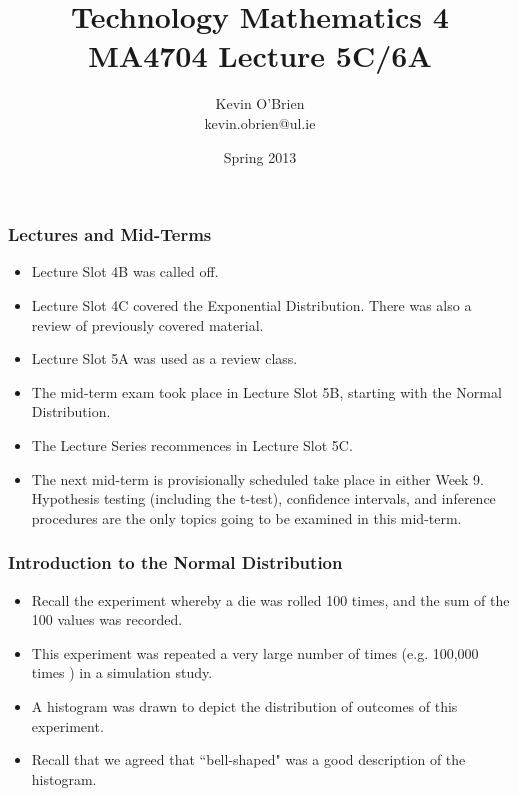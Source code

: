 \documentclass[a4]{beamer}
\title[MA4704]{Technology Mathematics 4 \\ {\normalsize MA4704 Lecture 5C/6A}}
\author[Kevin O'Brien]{Kevin O'Brien \\ {\scriptsize kevin.obrien@ul.ie}}
\date{Spring 2013}
\institute[Maths \& Stats]{Dept. of Mathematics \& Statistics, \\ University \textit{of} Limerick}
\begin{document}
\begin{frame}
\titlepage
\end{frame}
\begin{frame}
\frametitle{Lectures and Mid-Terms}
\begin{itemize}
\item Lecture Slot 4B was called off.
\item Lecture Slot 4C covered the Exponential Distribution. There was also a review of previously covered material.
\item Lecture Slot 5A was used as a review class.
\item The mid-term exam took place in Lecture Slot 5B, starting with the Normal Distribution.
\item The Lecture Series recommences in Lecture Slot 5C.
\item The next mid-term is provisionally scheduled take place in either Week 9. Hypothesis testing (including the t-test), confidence intervals, and inference procedures are the only topics going to be examined in this mid-term.
\end{itemize}
\end{frame}
\begin{frame}

\frametitle{Introduction to the Normal Distribution}
\begin{itemize}
\item
Recall the experiment whereby a die was rolled 100 times, and the sum of the 100 values was recorded.
\item
This experiment was repeated a very large number of times (e.g. 100,000 times ) in a simulation study.
\item
A histogram was drawn to depict the distribution of outcomes of this experiment.
\item Recall that we agreed that ``bell-shaped" was a good description of the histogram.

\end{itemize}
\end{frame}


\end{document}
